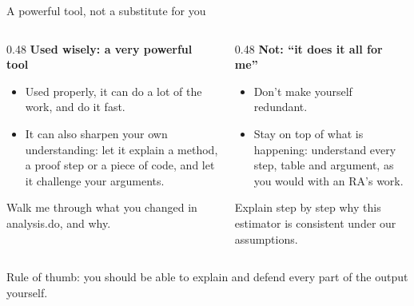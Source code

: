 \documentclass[aspectratio=169,11pt]{beamer}
\newcommand{\prompt}[1]{\begin{promptbox}\textcolor{accent}{\faCommentDots}\enspace #1\end{promptbox}}
\newcommand{\icon}[1]{\textcolor{accent}{#1}}
\begin{document}
\begin{frame}{A powerful tool, not a substitute for you}
  \label{tool}
  \begin{columns}[T]
    \begin{column}{0.48\textwidth}
      \icon{\faTools}\enspace\textbf{Used wisely: a very powerful tool}
      \begin{itemize}\small
        \item Used properly, it can do a lot of the work, and do it fast.
        \item It can also sharpen your own understanding: let it explain a method, a proof step or a piece of code, and let it challenge your arguments.
      \end{itemize}
      \prompt{Walk me through what you changed in analysis.do, and why.}
    \end{column}
    \begin{column}{0.48\textwidth}
      \icon{\faExclamationTriangle}\enspace\textbf{Not: ``it does it all for me''}
      \begin{itemize}\small
        \item Don't make yourself redundant.
        \item Stay on top of what is happening: understand every step, table and argument, as you would with an RA's work.
      \end{itemize}
      \prompt{Explain step by step why this estimator is consistent under our assumptions.}
    \end{column}
  \end{columns}
  \vspace{0.8em}
  \begin{keybox}
    \icon{\faLightbulb}\enspace Rule of thumb: you should be able to explain and defend every part of the output yourself.
  \end{keybox}
\end{frame}
\end{document}
